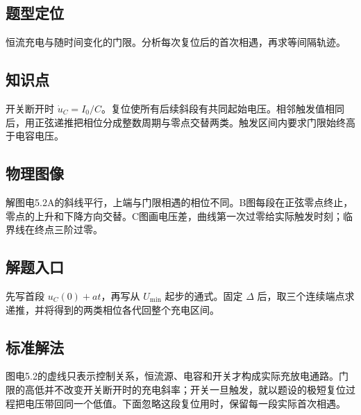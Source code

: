 \documentclass[UTF8,fontset=fandol,a4paper,11pt]{ctexart}
\begin{document}


\subsection*{题型定位}

恒流充电与随时间变化的门限。分析每次复位后的首次相遇，再求等间隔轨迹。



\subsection*{知识点}

开关断开时 $\dot u_C=I_0/C$。复位使所有后续斜段有共同起始电压。相邻触发值相同后，用正弦递推把相位分成整数周期与零点交替两类。触发区间内要求门限始终高于电容电压。



\subsection*{物理图像}

解图电5.2A的斜线平行，上端与门限相遇的相位不同。B图每段在正弦零点终止，零点的上升和下降方向交替。C图画电压差，曲线第一次过零给实际触发时刻；临界线在终点三阶过零。



\subsection*{解题入口}

先写首段 $u_C(0)+at$，再写从 $U_{\min}$ 起步的通式。固定 $\Delta$ 后，取三个连续端点求递推，并将得到的两类相位各代回整个充电区间。


\subsection*{标准解法}


图电5.2的虚线只表示控制关系，恒流源、电容和开关才构成实际充放电通路。门限的高低并不改变开关断开时的充电斜率；开关一旦触发，就以题设的极短复位过程把电压带回同一个低值。下面忽略这段复位用时，保留每一段实际首次相遇。
\end{document}
